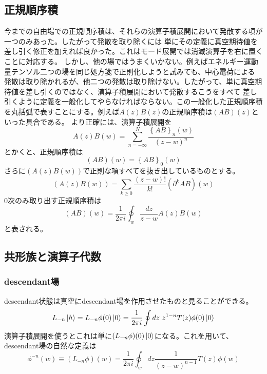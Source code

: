 \documentclass[11pt, aps, longbibliography]{article}
\numberwithin{equation}{section}
\begin{document}
    \subsection{正規順序積}
        今までの自由場での正規順序積は、それらの演算子積展開において発散する項が一つのみあった。したがって発散を取り除くには
        単にその定義に真空期待値を差し引く修正を加えれば良かった。これはモード展開では消滅演算子を右に置くことに対応する。
        しかし、他の場ではうまくいかない。例えばエネルギー運動量テンソル二つの場を同じ処方箋で正則化しようと試みても、中心電荷による
        発散は取り除かれるが、他二つの発散は取り除けない。したがって、単に真空期待値を差し引くのではなく、演算子積展開において発散するこうをすべて
        差し引くように定義を一般化してやらなければならない。この一般化した正規順序積を丸括弧で表すことにする。例えば$A(z)B(z)$の正規順序積は$(AB)(z)$といった具合である。
        より正確には、演算子積展開を
        \begin{equation}\label{eq:normalorder1}
            A(z)B(w) = \sum_{n=-\infty}^{N} \frac{\left\{ AB \right\}_n(w)}{(z-w)^n}
        \end{equation}
        とかくと、正規順序積は
        \begin{equation}\label{eq:normalorder2}
            (AB)(w) = \left\{ AB \right\}_0 (w)
        \end{equation}
        さらに$\left( A(z)B(w) \right)$で正則な項すべてを抜き出しているものとする。
        \begin{equation}\label{eq:normalorder3}
            \left( A(z)B(w) \right) = \sum_{k\geq0}\frac{(z-w)!}{k!}\left(\partial^k AB\right)(w)
        \end{equation}
        $0$次のみ取り出す正規順序積は
        \begin{equation}\label{eq:normalorder4}
            (AB)(w) = \frac{1}{2\pi i}\oint_w \frac{dz}{z-w}A(z)B(w)
        \end{equation}
        と表される。

    \subsection{共形族と演算子代数}
        \subsubsection{descendant場}
        descendant状態は真空にdescendant場を作用させたものと見ることができる。
        \begin{equation}\label{eq:family1-1}
            L_{-n}\ket{h} = L_{-n}\phi(0)\ket{0} = \frac{1}{2\pi i}\oint dz \ z^{1-n}T(z)\phi(0)\ket{0}
        \end{equation}
        演算子積展開を使うとこれは単に$(L_{-n}\phi)(0)\ket{0}$になる。これを用いて、descendant場の自然な定義は
        \begin{equation}\label{eq:family1-2}
            \phi^{-n}(w) \equiv (L_{-n}\phi)(w) = \frac{1}{2\pi i}\oint_w dz \frac{1}{(z-w)^{n-1}}T(z)\phi(w)
        \end{equation}
\end{document}
